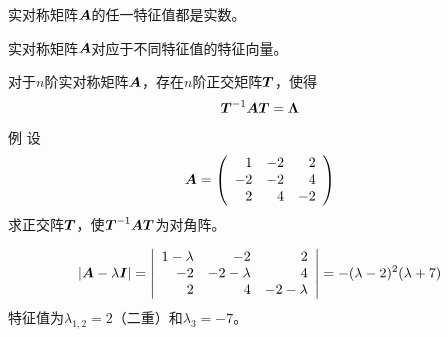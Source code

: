         \begin{frame}
          
          \begin{dingli}
            实对称矩阵$\boldsymbol{A}$的任一特征值都是实数。
          \end{dingli}
          
          \begin{dingli}
            实对称矩阵$\boldsymbol{A}$对应于不同特征值的特征向量。
          \end{dingli}
          
          
        \end{frame}



        \begin{frame}
          
          \begin{dingli}
            对于$n$阶实对称矩阵$\boldsymbol{A}$，存在$n$阶正交矩阵$\boldsymbol{T}$，使得
            $$
            \boldsymbol{T}^{-1}\boldsymbol{A}\boldsymbol{T}=\boldsymbol{\Lambda}
            $$
          \end{dingli}
          
          
        \end{frame}



        \begin{frame}
          
          \begin{li}{例}
            设
            $$
            \boldsymbol{A}=\left(
              \begin{array}{rrr}
                1&-2&2\\
                -2&-2&4\\
                2&4&-2
              \end{array}
            \right)
            $$
            求正交阵$\boldsymbol{T}$，使$\boldsymbol{T}^{-1}\boldsymbol{A}\boldsymbol{T}$为对角阵。      
          \end{li}
          \pause
          $$
          |\boldsymbol{A}-\lambda\boldsymbol{I}|=\left|
            \begin{array}{rrr}
              1-\lambda&-2&2\\
              -2&-2-\lambda&4\\
              2&4&-2-\lambda
            \end{array}
          \right| = -(\lambda-2)^2(\lambda+7)
          $$
          特征值为$\lambda_{1,2}=2$（二重）和$\lambda_3=-7$。
          
        \end{frame}



